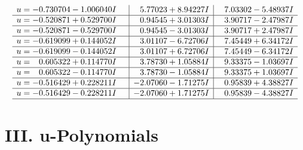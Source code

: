 \documentclass[1p]{elsarticle_modified}
\theoremstyle{definition}
\begin{document}
$$\begin{array}{c|c|c}
\begin{aligned}
u &= -0.730704 - 1.006040 I\end{aligned}
 & \phantom{-}5.77023 + 8.94227 I & \phantom{-}7.03302 - 5.48937 I \\ \hline\begin{aligned}
u &= -0.520871 + 0.529700 I\end{aligned}
 & \phantom{-}0.94545 + 3.01303 I & \phantom{-}3.90717 - 2.47987 I \\ \hline\begin{aligned}
u &= -0.520871 - 0.529700 I\end{aligned}
 & \phantom{-}0.94545 - 3.01303 I & \phantom{-}3.90717 + 2.47987 I \\ \hline\begin{aligned}
u &= -0.619099 + 0.144052 I\end{aligned}
 & \phantom{-}3.01107 - 6.72706 I & \phantom{-}7.45449 + 6.34172 I \\ \hline\begin{aligned}
u &= -0.619099 - 0.144052 I\end{aligned}
 & \phantom{-}3.01107 + 6.72706 I & \phantom{-}7.45449 - 6.34172 I \\ \hline\begin{aligned}
u &= \phantom{-}0.605322 + 0.114770 I\end{aligned}
 & \phantom{-}3.78730 + 1.05884 I & \phantom{-}9.33375 - 1.03697 I \\ \hline\begin{aligned}
u &= \phantom{-}0.605322 - 0.114770 I\end{aligned}
 & \phantom{-}3.78730 - 1.05884 I & \phantom{-}9.33375 + 1.03697 I \\ \hline\begin{aligned}
u &= -0.516429 + 0.228211 I\end{aligned}
 & -2.07060 - 1.71275 I & \phantom{-}0.95839 + 4.38827 I \\ \hline\begin{aligned}
u &= -0.516429 - 0.228211 I\end{aligned}
 & -2.07060 + 1.71275 I & \phantom{-}0.95839 - 4.38827 I\\
 \hline 
 \end{array}$$\newpage
\newpage\renewcommand{\arraystretch}{1}
\centering \section*{ III. u-Polynomials}
\end{document}
